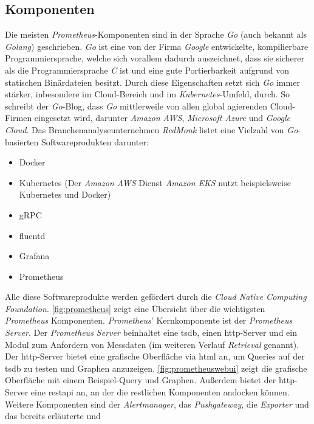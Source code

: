\documentclass[titlepage]{report}
\begin{document}
\subsection*{Komponenten}
Die meisten \emph{Prometheus}\hyp{}Komponenten sind in der Sprache
\emph{Go} (auch bekannt als \emph{Golang}) geschrieben. \emph{Go} ist
eine von der Firma \emph{Google} entwickelte, kompilierbare
Programmiersprache, welche sich vorallem dadurch auszeichnet, dass sie
sicherer als die Programmiersprache \emph{C} ist und eine gute
Portierbarkeit aufgrund von statischen Binärdateien besitzt. Durch diese
Eigenschaften setzt sich \emph{Go} immer stärker, inbesondere im
Cloud\hyp{}Bereich und im \emph{Kubernetes}\hyp{}Umfeld, durch\cite{INFOWORLD}.
So schreibt der \emph{Go}\hyp{}Blog, dass \emph{Go} mittlerweile von
allen global agierenden Cloud\hyp{}Firmen eingesetzt wird, darunter
\emph{Amazon AWS}, \emph{Microsoft Azure} und \emph{Google
Cloud}\cite{GOBLOG}. Das
Branchenanalyseunternehmen \emph{RedMonk} listet eine Vielzahl von
\emph{Go}\hyp{}basierten Softwareprodukten darunter\cite{REDMONK}:
\begin{itemize}
    \item Docker
    \item Kubernetes (Der \emph{Amazon AWS} Dienst \emph{Amazon EKS} nutzt
        beispielsweise Kubernetes und Docker)
    \item gRPC
    \item fluentd
    \item Grafana
    \item Prometheus
\end{itemize}
Alle diese Softwareprodukte werden gefördert durch die \emph{Cloud
Native Computing Foundation}\cite{CNCFLANDSCAPE}.
\autoref{fig:prometheus} zeigt eine Übersicht über die wichtigsten
\emph{Prometheus} Komponenten.
\emph{Prometheus}' Kernkomponente ist der \emph{Prometheus Server}. Der \emph{Prometheus
Server} beinhaltet eine \gls{tsdb}, einen \gls{http}\hyp{}Server und ein
Modul zum Anfordern von Messdaten (im weiteren Verlauf
\emph{Retrieval} genannt). Der \gls{http}\hyp{}Server bietet eine grafische
Oberfläche via \gls{html} an, um Queries auf der \gls{tsdb} zu testen
und Graphen anzuzeigen. \autoref{fig:prometheuswebui} zeigt
die grafische Oberfläche mit einem Beispiel\hyp{}Query und Graphen.
Außerdem bietet der \gls{http}\hyp{}Server
eine \gls{restapi} an, an der die restlichen Komponenten andocken
können. Weitere Komponenten sind der \emph{Alertmanager}, das
\emph{Pushgateway}, die \emph{Exporter} und das bereits erläuterte und
\end{document}
